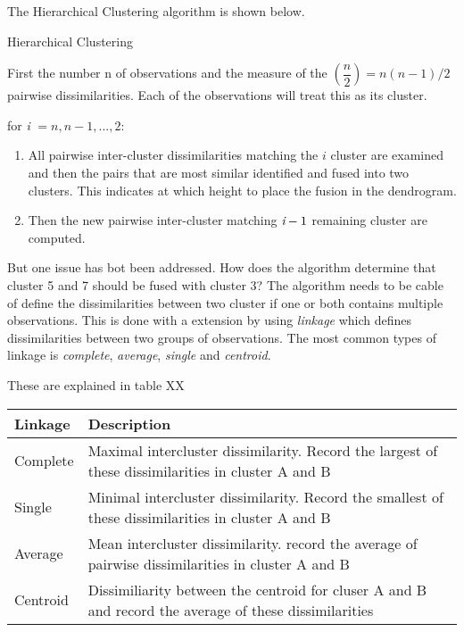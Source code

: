 The Hierarchical Clustering algorithm is shown below.

\begin{algorithm}
	\caption{Hierarchical Clustering}
	\label{algo:HierarchicalClustering}
	\begin{algorithmic}[1]
 		\State First the number n of observations and the measure of the $(\dfrac{n}{2}) =n(n-1)/2 $ pairwise dissimilarities. Each of the observations will treat this as its cluster.
 		
 		\State for \emph{i} $= n,n-1,...,2:$
 		\begin{enumerate}[label=(\alph*)]
 			\item All pairwise inter-cluster dissimilarities matching the $i$ cluster are examined and then the pairs that are most similar identified and fused into two clusters. This indicates at which height to place the fusion in the dendrogram.
 			\item Then the new pairwise inter-cluster matching $\emph{i}-1$ remaining cluster are computed.
 		\end{enumerate}
 	\end{algorithmic}
 \end{algorithm}

But one issue has bot been addressed. How does the algorithm determine that cluster 5 and 7 should be fused with cluster 3? The algorithm needs to be cable of define the dissimilarities between two cluster if one or both contains multiple observations. This is done with a extension by using \emph{linkage} which defines dissimilarities between two groups of observations. The most common types of linkage is \emph{complete}, \emph{average}, \emph{single} and
\emph{centroid}.

These are explained in table XX
\begin{center}
	\begin{tabular}{ | l | p{12cm} |}
		\hline
		Linkage & Description \\ \hline
		Complete & Maximal intercluster dissimilarity. Record the largest of these dissimilarities in cluster A and B \\ \hline
		Single & Minimal intercluster dissimilarity. Record the smallest of these dissimilarities in cluster A and B \\ \hline
		Average & Mean intercluster dissimilarity. record the average of pairwise dissimilarities in cluster A and B\\
		\hline
		Centroid & Dissimiliarity between the centroid for cluser A and B and record the average of these dissimilarities
		\\
		\hline
	\end{tabular}
\end{center}

